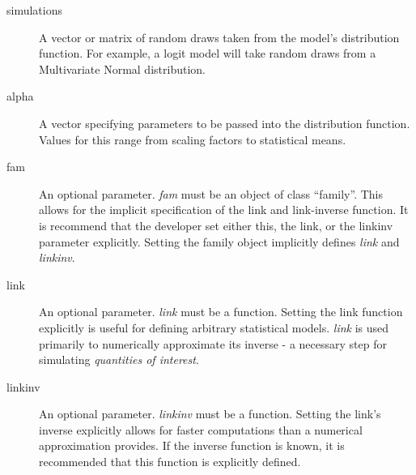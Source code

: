 \begin{description}
	\item[simulations] A vector or matrix of random draws taken from
		the model's distribution function.  For example, a logit model
		will take random draws from a Multivariate Normal distribution.
		
	\item[alpha] A vector specifying parameters to be passed into
		the distribution function.  Values for this range from scaling
		factors to statistical means.
	
	\item[fam] An optional parameter.  \emph{fam} must be an object
		of class ``family''.  This allows for the implicit specification
		of the link and link-inverse function.  It is recommend that the
		developer set either this, the link, or the linkinv parameter
		explicitly.  Setting the family object implicitly defines
		\emph{link} and \emph{linkinv}.
		
	\item[link] An optional parameter.  \emph{link} must be a function.
		Setting the link function explicitly is useful for defining
		arbitrary statistical models.  \emph{link} is used primarily to
		numerically approximate its inverse - a necessary step for
		simulating \emph{quantities of interest}.
		
	\item[linkinv] An optional parameter.  \emph{linkinv} must be a
		function.  Setting the link's inverse explicitly allows for faster
		computations than a numerical approximation provides.  If the
		inverse function is known, it is recommended that this function
		is explicitly defined.
		
\end{description}



